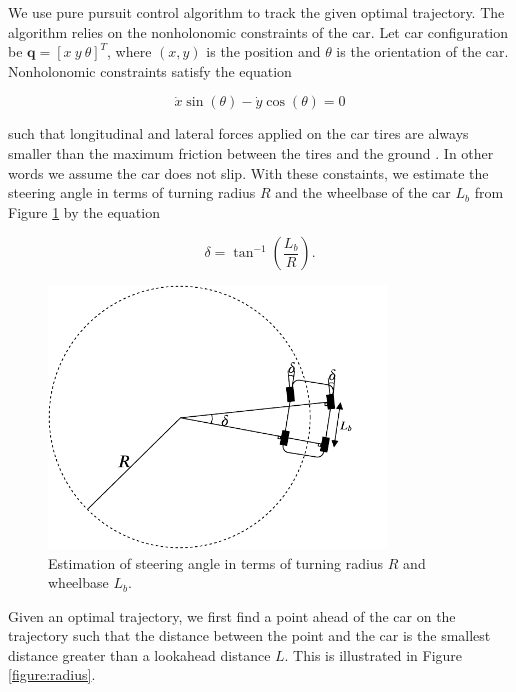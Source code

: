 We use pure pursuit control algorithm to track the given optimal trajectory.
The algorithm relies on the nonholonomic constraints of the car. Let car
configuration be $\textbf{q} = [x\ y\ \theta]^T$, where $(x, y)$ is the
position and $\theta$ is the orientation of the car. Nonholonomic constraints
satisfy the equation

\begin{equation}
  \dot{x}\sin(\theta) - \dot{y}\cos(\theta) = 0
  \label{eq:nonholonomic}
\end{equation}

such that longitudinal and lateral forces applied on the car tires are always
smaller than the maximum friction between the tires and the ground
\cite{Kim2013SensorbasedMP}. In other words we assume the car does not slip.
With these constaints, we estimate the steering angle in terms of turning
radius $R$ and the wheelbase of the car $L_b$ from Figure \ref{figure:steering}
by the equation

\begin{equation}
  \delta = \tan^{-1}(\frac{L_b}{R}).
  \label{eq:steering}
\end{equation}

\begin{figure}[h]
  \centering
  \includegraphics[width=0.8\textwidth]{figures/pure-pursuit-steering.pdf}
  \caption[Steering angle geometry in pure pursuit controller]{Estimation of
    steering angle in terms of turning radius $R$ and wheelbase $L_b$.}
  \label{figure:steering}
\end{figure}

Given an optimal trajectory, we first find a point ahead of the car on the
trajectory such that the distance between the point and the car is the smallest
distance greater than a lookahead distance $L$. This is illustrated in Figure
\ref{figure:radius}.

